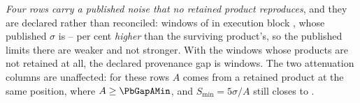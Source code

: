 \emph{Four rows carry a published noise that no retained product
reproduces}, and they are declared rather than reconciled: \PbGapN{} windows
of \PbGapStar{} in execution block \texttt{\PbGapEb}, whose published
$\sigma$ is \PbGapPctLo--\PbGapPctHi{} per cent \emph{higher} than the
surviving product's, so the published limits there are weaker and not
stronger. With the \PbGapNoProd{} windows whose products are not retained at
all, the declared provenance gap is \PbGapDeclared{} windows. The two
attenuation columns are unaffected: for these rows $A$ comes from a retained
product at the same position, where $A\ge\PbGapAMin$, and
$S_{\min}=5\sigma/A$ still closes to \PbGapSminRes.

